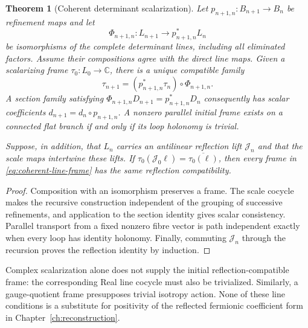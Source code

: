\documentclass[11pt,a4paper,oneside]{book}
\theoremstyle{plain}
\newtheorem{theorem}{Theorem}[chapter]
\theoremstyle{definition}
\theoremstyle{remark}
\newcommand{\C}{\mathbb C}
\newcommand{\src}[2]{\cite{#1}}
\begin{document}
\begin{theorem}[Coherent determinant scalarization]
\label{thm:coherent-line}
Let $p_{n+1,n}:B_{n+1}\to B_n$ be refinement maps and let
\[
 \Phi_{n+1,n}:L_{n+1}\longrightarrow p_{n+1,n}^{*}L_n
\]
be isomorphisms of the complete determinant lines, including all eliminated
factors.  Assume their compositions agree with the direct line maps.  Given
a scalarizing frame $\tau_0:L_0\to\C$, there is a unique compatible family
\begin{equation}
 \tau_{n+1}=(p_{n+1,n}^{*}\tau_n)\circ\Phi_{n+1,n}.
 \label{eq:coherent-line-frame}
\end{equation}
A section family satisfying
$\Phi_{n+1,n}D_{n+1}=p_{n+1,n}^{*}D_n$ consequently has scalar coefficients
$d_{n+1}=d_n\circ p_{n+1,n}$.  A nonzero parallel initial frame exists on a
connected flat branch if and only if its loop holonomy is trivial.

Suppose, in addition, that $L_n$ carries an antilinear reflection lift
$\mathcal J_n$ and that the scale maps intertwine these lifts.  If
$\tau_0(\mathcal J_0\ell)=\overline{\tau_0(\ell)}$, then every frame in
\eqref{eq:coherent-line-frame} has the same reflection compatibility.
\end{theorem}
\begin{proof}
Composition with an isomorphism preserves a frame.  The scale cocycle makes
the recursive construction independent of the grouping of successive
refinements, and application to the section identity gives scalar
consistency.  Parallel transport from a fixed nonzero fibre vector is
path independent exactly when every loop has identity holonomy.  Finally,
commuting $\mathcal J_n$ through the recursion proves the reflection
identity by induction.
\end{proof}
\src{R10}{thm:v97-flat-holonomy,thm:v97-projective-scalarization,prop:v97-reflection-frame}

Complex scalarization alone does not supply the initial reflection-compatible
frame: the corresponding Real line cocycle must also be trivialized.
Similarly, a gauge-quotient frame presupposes trivial isotropy action.  None
of these line conditions is a substitute for positivity of the reflected
fermionic coefficient form in Chapter~\ref{ch:reconstruction}.
\end{document}
